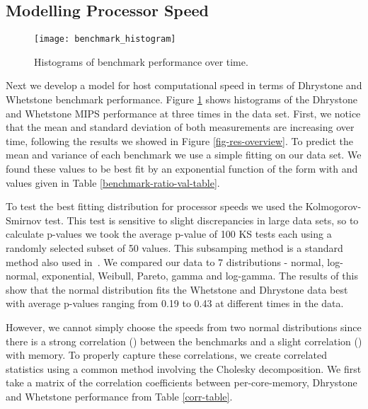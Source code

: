 \documentclass[conference]{IEEEtran}
\begin{document}
\subsection{Modelling Processor Speed}
\label{sec-model-speed}

\begin{figure}[!t]
\centering
\texttt{[image: benchmark\_histogram]}
\caption{Histograms of benchmark performance over time.}
\label{fig-benchmark-hist}
\end{figure}

Next we develop a model for host computational speed in
terms of Dhrystone and Whetstone benchmark performance.
Figure \ref{fig-benchmark-hist} shows histograms of the
Dhrystone and Whetstone MIPS performance at three times in
the data set.  First, we notice that the mean and standard
deviation of both measurements are increasing over time,
following the results we showed in Figure
\ref{fig-res-overview}.  To predict the mean and variance of
each benchmark we use a simple fitting on our data set.  We
found these values to be best fit by an exponential function
of the form  with  and  values
given in Table \ref{benchmark-ratio-val-table}.

To test the best fitting distribution for processor speeds
we used the Kolmogorov-Smirnov test.  This test is sensitive
to slight discrepancies in large data sets, so to calculate
p-values we took the average p-value of 100 KS tests each
using a randomly selected subset of 50 values. This
subsamping method is a standard method also used
in~\cite{Javadi:2009p7323,Nurmi:2005p333}.  We compared
our data to 7 distributions - normal, log-normal, exponential,
Weibull, Pareto, gamma and log-gamma. The results of
this show that the normal distribution fits the Whetstone
and Dhrystone data best with average p-values ranging from
0.19 to 0.43 at different times in the data.

However, we cannot simply choose the speeds from two normal
distributions since there is a strong correlation () between the benchmarks and a slight correlation
() with memory.  To properly capture these correlations,
we create correlated statistics using a common method
involving the Cholesky decomposition.  We first take a
matrix  of the correlation coefficients between
per-core-memory, Dhrystone and Whetstone performance from
Table \ref{corr-table}.
\end{document}
